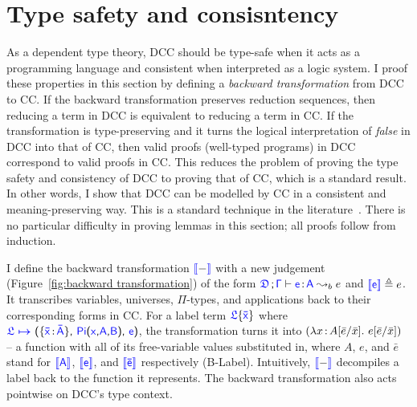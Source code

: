 
\section{Type safety and consisntency}
\label{sec:5.2}

As a dependent type theory, DCC should be type-safe when it acts as a programming language and consistent when interpreted as a logic system. I proof these properties in this section by defining a \textit{backward transformation} from DCC to CC. If the backward transformation preserves reduction sequences, then reducing a term in DCC is equivalent to reducing a term in CC. If the transformation is type-preserving and it turns the logical interpretation of \textit{false} in DCC into that of CC, then valid proofs (well-typed programs) in DCC correspond to valid proofs in CC. This reduces the problem of proving the type safety and consistency of DCC to proving that of CC, which is a standard result. In other words, I show that DCC can be modelled by CC in a consistent and meaning-preserving way. This is a standard technique in the literature~\cite{DBLP:conf/cpp/BoulierPT17,DBLP:conf/pldi/BowmanA18}. There is no particular difficulty in proving lemmas in this section; all proofs follow from induction. 

I define the backward transformation $\bluebr{-}$ with a new judgement (Figure~\ref{fig:backward transformation}) of the form $\targetcon \vdash \itemtype{e}{A} \leadsto_b e$ and $\bluebr{\target{e}} \triangleq e$. It transcribes variables, universes, $\Pi$-types, and applications back to their corresponding forms in CC. For a label term $\targetlab{\flabel}{\bar{x}}$ where 
$\itemdef{\target{\flabel}}{\itemtype{\bar{x}}{\bar{A}}}{\targetpi{x}{A}{B}}{\target{e}}$, the transformation turns it into 
$(\lambda x\hspace{0.5mm}{:}\hspace{0.5mm} A[\bar{e}\slash\bar{x}].\ e[\bar{e}\slash\bar{x}])$ -- a function with all of its free-variable values substituted in, where $A$, $e$, and $\bar{e}$ stand for $\bluebr{\target{A}}$, $\bluebr{\target{e}}$, and $\bluebr{\target{\bar{e}}}$ respectively (B-Label). Intuitively, $\bluebr{-}$ decompiles a label back to the function it represents. The backward transformation also acts pointwise on DCC's type context.

